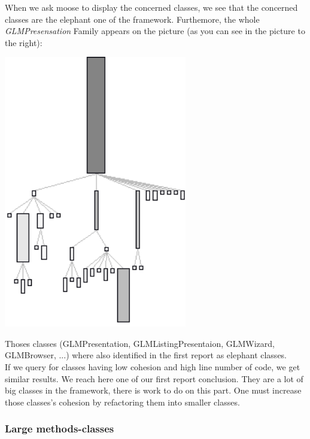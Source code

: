 \documentclass[11pt,a4paper]{article}
\begin{document}
\begin{minipage}[t]{0.4\textwidth}
When we ask moose to display the concerned classes, we see that the concerned classes are the elephant one of the framework. Furthemore, the whole \textit{GLMPresensation} Family appears on the picture (as you can see in the picture to the right):

\end{minipage}
\hfill
\begin{minipage}[t]{0.6\textwidth}
    \centering
     \vspace{-1.5ex}
\includegraphics[width=0.6\textwidth]{GLMPresentation_family}
\end{minipage} 


Thoses classes (GLMPresentation, GLMListingPresentaion, GLMWizard, GLMBrowser, ...)  where also identified in the first report as elephant  classes.\\

If we query for classes having low cohesion and high line number of code, we get similar results. We reach here one of our first report conclusion. They are a lot of big classes in the framework, there is work to do on this part. One must increase those classes's cohesion by refactoring them into smaller classes.\\
 
\subsubsection{Large methods-classes} 
\end{document}
